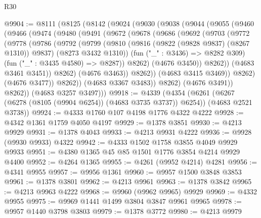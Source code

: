 \begin{lexlean}{R30}
\begin{coremodule}
{{{{{@9904 := @8111
    (@8125
      (@8142
        (@9024
          (@9030
            (@9038
              (@9044
                (@9055
                  (@9460
                    (@9466
                      (@9474
                        (@9480
                          (@9491
                            (@9672
                              (@9678
                                (@9686
                                  (@9692
                                    (@9703
                                      (@9772
                                        (@9778
                                          (@9786
                                            (@9792
                                              (@9799
                                                (@9810
                                                  (@9816 (@9822 (@9828 @9837) (@8267 @1310)) @9837)
                                                  (@8273 @3432 @1310))
                                                (fun ("_" : @3436) => @8282 @309)
                                                (fun ("_" : @3435 @4580) => @8287))
                                              @8262)
                                            (@4676 @3450))
                                          @8262))
                                      (@4683 @3461 @3451))
                                    @8262)
                                  (@4676 @3463))
                                @8262))
                            (@4683 @3415 @3469))
                          @8262)
                        (@4676 @3477))
                      @8262))
                  (@4683 @3367 @3483))
                @8262)
              (@4676 @3491))
            @8262))
        (@4683 @3257 @3497)))
@9918 := @4339
    (@4354
      (@6261 (@6267 (@6278 (@8105 (@9904 @6254)) (@4683 @3735 @3737)) @6254))
      (@4683 @2521 @3738))
@9924 := @4333 @1760 @107 @4198 @1776 @4322 @4222
@9928 := @4342 @1361 @1759 @4050 @4197
@9929 := @1378 @3851
@9930 := @4213 @9929
@9931 := @1378 @4043
@9933 := @4213 @9931 @4222
@9936 := @9928 (@9930 @9933) @4322
@9942 := @4333 @1502 @1758 @3855 @4049 @9929 @9933
@9951 := @4380 @1365 @45 @85 @1501 @1776 @3854 @4214 @9929 @4400
@9952 := @4264 @1365
@9955 := @4261 (@9952 @4214) @4281
@9956 := @4341 @9955
@9957 := @9956 @1361
@9960 := @9957 @1500 @3848 @3853
@9961 := @1378 @3801
@9962 := @4213 @9961
@9963 := @1378 @3842
@9965 := @4213 @9963 @4222
@9968 := @9960 (@9962 @9965) @9929
@9969 := @4332 @9955
@9975 := @9969 @1441 @1499 @3804 @3847 @9961 @9965
@9978 := @9957 @1440 @3798 @3803
@9979 := @1378 @3772
@9980 := @4213 @9979
}}}}}
\end{coremodule}
\end{lexlean}

